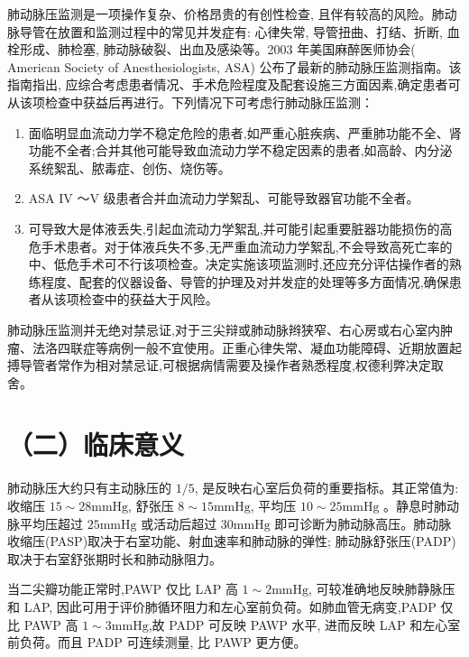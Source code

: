 \documentclass[10pt]{article}
\begin{document}
肺动脉压监测是一项操作复杂、价格昂贵的有创性检查, 且伴有较高的风险。肺动脉导管在放置和监测过程中的常见并发症有: 心律失常, 导管扭曲、打结、折断, 血栓形成、肺检塞, 肺动脉破裂、出血及感染等。2003 年美国麻醉医师协会( American Society of Anesthesiologists, ASA) 公布了最新的肺动脉压监测指南。该指南指出, 应综合考虑患者情况、手术危险程度及配套设施三方面因素,确定患者可从该项检查中获益后再进行。下列情况下可考虑行肺动脉压监测：

\begin{enumerate}
  \item 面临明显血流动力学不稳定危险的患者,如严重心脏疾病、严重肺功能不全、肾功能不全者;合并其他可能导致血流动力学不稳定因素的患者,如高龄、内分泌系统絮乱、脓毒症、创伤、烧伤等。

  \item ASA IV ～V 级患者合并血流动力学絮乱、可能导致器官功能不全者。

  \item 可导致大是体液丢失,引起血流动力学絮乱,并可能引起重要脏器功能损伤的高危手术患者。对于体液兵失不多,无严重血流动力学絮乱,不会导致高死亡率的中、低危手术可不行该项检查。决定实施该项监测时,还应充分评估操作者的熟练程度、配套的仪器设备、导管的护理及对并发症的处理等多方面情况,确保患者从该项检查中的获益大于风险。

\end{enumerate}

肺动脉压监测并无绝对禁忌证,对于三尖辩或肺动脉辫狭窄、右心房或右心室内肿瘤、法洛四联症等病例一般不宜使用。正重心律失常、凝血功能障碍、近期放置起搏导管者常作为相对禁忌证,可根据病情需要及操作者熟悉程度,权德利弊决定取舍。

\section*{（二）临床意义}
肺动脉压大约只有主动脉压的 $1 / 5$, 是反映右心室后负荷的重要指标。其正常值为: 收缩压 $15 \sim 28 \mathrm{mmHg}$, 舒张压 $8 \sim 15 \mathrm{mmHg}$, 平均压 $10 \sim 25 \mathrm{mmHg}$ 。静息时肺动脉平均压超过 $25 \mathrm{mmHg}$ 或活动后超过 $30 \mathrm{mmHg}$ 即可诊断为肺动脉高压。肺动脉收缩压(PASP)取决于右室功能、射血速率和肺动脉的弹性; 肺动脉舒张压(PADP)取决于右室舒张期时长和肺动脉阻力。

当二尖瓣功能正常时,PAWP 仅比 LAP 高 $1 \sim 2 \mathrm{mmHg}$, 可较准确地反映肺静脉压和 LAP, 因此可用于评价肺循环阻力和左心室前负荷。如肺血管无病变,PADP 仅比 PAWP 高 $1 \sim 3 \mathrm{mmHg}$,故 PADP 可反映 PAWP 水平, 进而反映 LAP 和左心室前负荷。而且 PADP 可连续测量, 比 PAWP 更方便。
\end{document}
